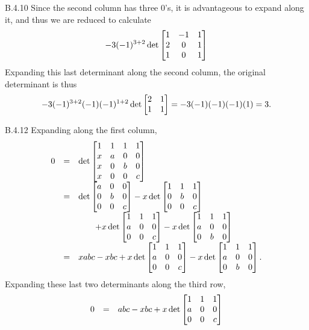 \begin{Answer}{B.4.10}
 Since the second column has three $0$'s, it is advantageous
to expand along it, and thus we are reduced to calculate
$$-3(-1)^{3 + 2} \det \begin{bmatrix}
                1 & -1 & 1 \cr
                2 & 0 & 1 \cr
                1 & 0 & 1 \cr
\end{bmatrix}$$
Expanding this last determinant along the second column, the
original determinant is thus
$$-3(-1)^{3 + 2}(-1)(-1)^{1 + 2}\det \begin{bmatrix}
            2 & 1 \cr
            1 & 1 \cr
\end{bmatrix} = -3(-1)(-1)(-1)(1) = 3.$$
\end{Answer}
\begin{Answer}{B.4.12}
 Expanding along the first column,
$$\begin{array}{lll} 0 & = &  \det\begin{bmatrix} 1 & 1 & 1 & 1 \cr x & a & 0 & 0 \cr
x & 0 & b & 0 \cr x & 0 & 0 & c\cr \end{bmatrix} \\
& = & \det\begin{bmatrix}a & 0 & 0 \cr 0 & b & 0 \cr 0 & 0 & c \cr
\end{bmatrix} - x\det\begin{bmatrix} 1 & 1 & 1 \cr 0 & b & 0 \cr 0
& 0 & c \cr \end{bmatrix} \\ & & \qquad  + x\det\begin{bmatrix}1 &
1 & 1 \cr a & 0 & 0 \cr 0 & 0 & c \cr  \end{bmatrix}
- x\det\begin{bmatrix} 1 & 1 & 1 \cr a & 0 & 0 \cr  0 & b & 0 \cr \end{bmatrix} \\
& = & xabc - xbc + x\det\begin{bmatrix}1 & 1 & 1 \cr a & 0 & 0 \cr
0 & 0 & c \cr  \end{bmatrix} - x\det\begin{bmatrix} 1 & 1 & 1 \cr
a & 0 & 0 \cr  0 & b & 0 \cr \end{bmatrix}.\\ \end{array}$$
Expanding these  last  two determinants along the third row,
$$\begin{array}{lll} 0 & = & abc - xbc
+ x\det\begin{bmatrix}1 & 1 & 1 \cr a & 0 & 0 \cr 0 & 0 & c \cr
\end{bmatrix}

\end{array}$$
\end{Answer}
